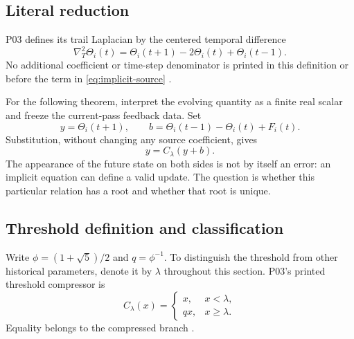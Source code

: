 \documentclass[11pt,a4paper]{article}
\theoremstyle{definition}
\newcommand{\phig}{\phi}
\numberwithin{equation}{section}
\begin{document}
\subsection{Literal reduction}

P03 defines its trail Laplacian by the centered temporal difference
\begin{equation}
 \nabla_T^2\Theta_i(t)=
 \Theta_i(t+1)-2\Theta_i(t)+\Theta_i(t-1).
 \label{eq:temporal}
\end{equation}
No additional coefficient or time-step denominator is printed in this
definition or before the term in \eqref{eq:implicit-source}
\cite[physical p.~8, \S3.3]{P03}.

For the following theorem, interpret the evolving quantity as a finite real
scalar and freeze the current-pass feedback data. Set
\begin{equation}
 y=\Theta_i(t+1),\qquad
 b=\Theta_i(t-1)-\Theta_i(t)+F_i(t).
 \label{eq:offset}
\end{equation}
Substitution, without changing any source coefficient, gives
\begin{equation}
 \boxed{y=C_\lambda(y+b).}
 \label{eq:root}
\end{equation}
The appearance of the future state on both sides is not by itself an error:
an implicit equation can define a valid update. The question is whether this
particular relation has a root and whether that root is unique.

\subsection{Threshold definition and classification}

Write $\phig=(1+\sqrt5)/2$ and $q=\phig^{-1}$. To distinguish the threshold
from other historical parameters, denote it by $\lambda$ throughout this
section. P03's printed threshold compressor is
\begin{equation}
 C_\lambda(x)=
 \begin{cases}
 x,&x<\lambda,\\
 qx,&x\geq\lambda.
 \end{cases}
 \label{eq:compressor}
\end{equation}
Equality belongs to the compressed branch
\cite[physical p.~8, \S3.4]{P03}.
\end{document}
